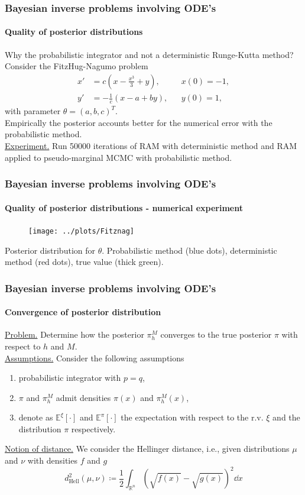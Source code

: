 \documentclass{beamer}
\newcommand{\R}{\mathbb{R}}
\newcommand{\E}{\mathbb{E}}
\newcommand{\defeq}{\coloneqq}
\newcommand{\Hell}{d_{\mathrm{Hell}}}
\begin{document}
\begin{frame}
	\frametitle{Bayesian inverse problems involving ODE's}
	\framesubtitle{Quality of posterior distributions}
	
	Why the probabilistic integrator and not a deterministic Runge-Kutta method?
	Consider the FitzHug-Nagumo problem
	\begin{equation*}
	\begin{aligned}
		x' &= c\left(x - \frac{x^3}{3} + y\right), && x(0) = -1, \\
		y' &= -\frac{1}{c}(x - a + by), && y(0) = 1,
	\end{aligned}
	\end{equation*}
	with parameter $\theta = (a, b, c)^T$. \\
	Empirically \cite{CGS16} the posterior accounts better for the numerical error with the probabilistic method. \\[0.5cm]
	\underline{Experiment.} Run 50000 iterations of RAM with deterministic method and RAM applied to pseudo-marginal MCMC with probabilistic method.
\end{frame}

\begin{frame}
	\frametitle{Bayesian inverse problems involving ODE's}
	\framesubtitle{Quality of posterior distributions - numerical experiment}
	
	\begin{figure}
		\centering
		\texttt{[image: ../plots/Fitznag]}
	\end{figure}
	Posterior distribution for $\theta$. Probabilistic method (blue dots), deterministic method (red dots), true value (thick green).
\end{frame}

\begin{frame}
	\frametitle{Bayesian inverse problems involving ODE's}
	\framesubtitle{Convergence of posterior distribution}
	
	\underline{Problem.} Determine how the posterior $\pi_h^M$ converges to the true posterior $\pi$ with respect to $h$ and $M$.\\[0.5cm]
	\underline{Assumptions.} Consider the following assumptions
	\begin{enumerate}
		\item probabilistic integrator with $p = q$,
		\item $\pi$ and $\pi_h^M$ admit densities $\pi(x)$ and $\pi_h^M(x)$,
		\item denote as $\E^\xi[\cdot]$ and $\E^\pi[\cdot]$ the expectation with respect to the r.v. $\xi$ and the distribution $\pi$ respectively.
	\end{enumerate}
	\vspace{0.5cm}
	\underline{Notion of distance.} We consider the Hellinger distance, i.e., given distributions $\mu$ and $\nu$ with densities $f$ and $g$
	\begin{equation*}
		\Hell^2(\mu, \nu) \defeq \frac{1}{2}\int_{\R^n}\left(\sqrt{f(x)} - \sqrt{g(x)}\right)^2\dd x
	\end{equation*}
\end{frame}
\end{document}
